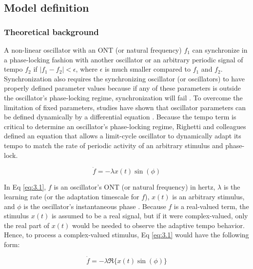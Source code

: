 \documentclass{report}
\begin{document}
\subsection{Model definition}

\subsubsection{Theoretical background}

A non-linear oscillator with an ONT (or natural frequency) $f_1$ can synchronize in a phase-locking fashion with another oscillator or an arbitrary periodic signal of tempo $f_2$ if $|f_1 − f_2| < \epsilon$, where $\epsilon$ is much smaller compared to $f_1$ and $f_2$. Synchronization also requires the synchronizing oscillator (or oscillators) to have properly defined parameter values because if any of these parameters is outside the oscillator's phase-locking regime, synchronization will fail \cite{righetti2006dynamic}. To overcome the limitation of fixed parameters, studies have shown that oscillator parameters can be defined dynamically by a differential equation \cite{acebron1998adaptive, borisyuk2001oscillatory, ermentrout1991adaptive, nakanishi2003learning, nishii1999learning, righetti2006dynamic}. Because the tempo term is critical to determine an oscillator's phase-locking regime, Righetti and colleagues \cite{righetti2006dynamic} defined an equation that allows a limit-cycle oscillator to dynamically adapt its tempo to match the rate of periodic activity of an arbitrary stimulus and phase-lock.

\begin{equation}
\dot{f} = -\lambda x(t) \sin(\phi) \label{eq:3.1}
\end{equation}

In Eq \eqref{eq:3.1}, $f$ is an oscillator's ONT (or natural frequency) in hertz, $\lambda$ is the learning rate (or the adaptation timescale for $f$), $x(t)$ is an arbitrary stimulus, and $\phi$ is the oscillator's instantaneous phase \cite{righetti2006dynamic}. Because $f$ is a real-valued term, the stimulus $x(t)$ is assumed to be a real signal, but if it were complex-valued, only the real part of $x(t)$ would be needed to observe the adaptive tempo behavior. Hence, to process a complex-valued stimulus, Eq \eqref{eq:3.1} would have the following form:

\begin{equation}
\dot{f} = -\lambda \Re \{ x(t) \sin(\phi) \} \label{eq:3.2}
\end{equation}
\end{document}
